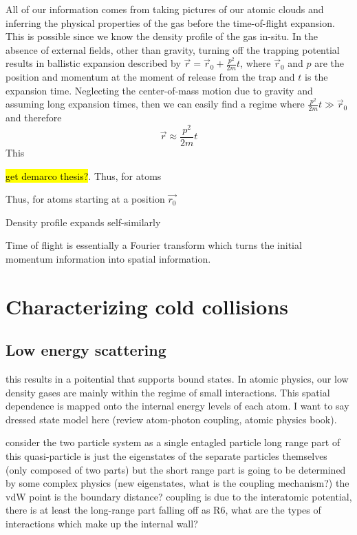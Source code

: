 All of our information comes from taking pictures of our atomic clouds and inferring the physical properties of the gas before the time-of-flight expansion. This is possible since we know the density profile of the gas in-situ. In the absence of external fields, other than gravity, turning off the trapping potential results in ballistic expansion described by $\vec{r} = \vec{r}_0 + \frac{p^2}{2m}t$, where $\vec{r}_0$ and $p$ are the position and momentum at the moment of release from the trap and $t$ is the expansion time. Neglecting the center-of-mass motion due to gravity and assuming long expansion times, then we can easily find a regime where $\frac{p^2}{2m}t \gg \vec{r}_0$ and therefore
	\begin{equation}
		\vec{r} \approx \frac{p^2}{2m}t
	\end{equation}
This 



 \cite{Ketterle1999} \hl{get demarco thesis?}. Thus, for atoms 

Thus, for atoms starting at a position $\vec{r_0}$ 

Density profile expands self-similarly 

Time of flight is essentially a Fourier transform which turns the initial momentum information into spatial information.



\section{Characterizing cold collisions} \label{sec:cold_collisions}



\subsection{Low energy scattering} \label{ssec:scattering}

this results in a poitential that supports bound states. 
In atomic physics, our low density gases are mainly within the regime of small interactions. 
This spatial dependence is mapped onto the internal energy levels of each atom. I want to say dressed state model here (review atom-photon coupling, atomic physics book).

consider the two particle system as a single entagled particle
	long range part of this quasi-particle is just the eigenstates of the separate particles themselves (only composed of two parts)
	but the short range part is going to be determined by some complex physics (new eigenstates, what is the coupling mechanism?)
		the vdW point is the boundary distance?
		coupling is due to the interatomic potential, there is at least the long-range part falling off as R6, what are the types of interactions which make up the internal wall?


